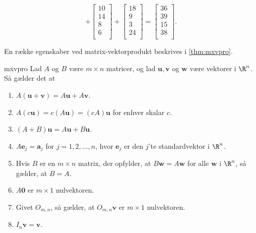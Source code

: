 \begin{eks}
$$+
\begin{bmatrix}
10\\
14\\
8\\
6\\
\end{bmatrix}
+
\begin{bmatrix}
18\\
9\\
3\\
24\\
\end{bmatrix}
=
\begin{bmatrix}
36\\
39\\
15\\
38\\
\end{bmatrix}.
$$
\end{eks}
% 
En række egenskaber ved matrix-vektorprodukt beskrives i \ref{thm:mxvpro}.
%
\begin{thm}{}{mxvpro}
Lad $A$ og $B$ være $m \times n$ matricer, og lad $\mathbf{u}, \mathbf{v}$ og $\mathbf{w}$ være vektorer i $\R^n$. Så gælder det at
\begin{enumerate}[label=(\alph*)]
\item $A(\mathbf{u}+\mathbf{v})=A\mathbf{u}+A\mathbf{v}$.
\item $A(c\mathbf{u})=c(A\mathbf{u})=(cA)\mathbf{u}$ for enhver skalar $c$.
\item $(A+B)\mathbf{u}=A\mathbf{u}+B\mathbf{u}$.
\item $A\mathbf{e}_j=\mathbf{a}_j$ for $j=1,2,\ldots,n$, hvor $\mathbf{e}_j$ er den $j$'te standardvektor i $\R^n$.
\item Hvis $B$ er en $m \times n$ matrix, der opfylder, at $B\mathbf{w}=A\mathbf{w}$ for alle $\mathbf{w}$ i $\R^n$, så gælder, at $B=A$.
\item $A\mathbf{0}$ er $m \times 1$ nulvektoren.
\item Givet $O_{m,n}$, så gælder, at $O_{m,n}\mathbf{v}$ er $m \times 1$ nulvektoren.
\item $I_n\mathbf{v}=\mathbf{v}$.
\end{enumerate}
\end{thm}
%

